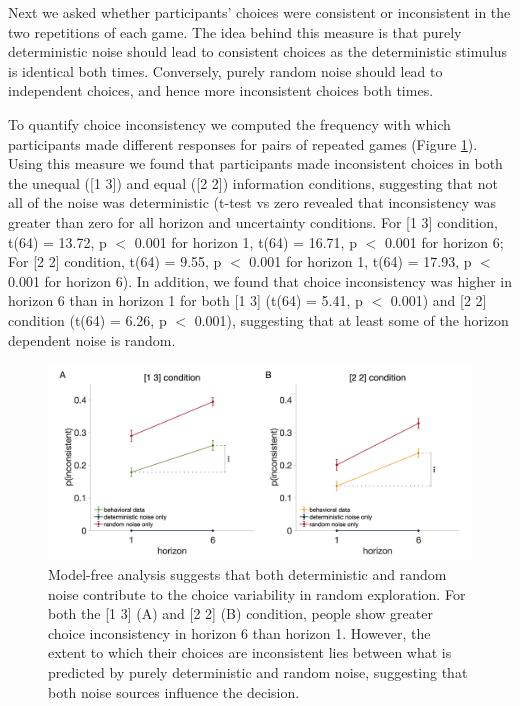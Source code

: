\documentclass[12pt]{article}
\begin{document}
	Next we asked whether participants' choices were consistent or inconsistent in the two repetitions of each game.  The idea behind this measure is that purely deterministic noise should lead to consistent choices as the deterministic stimulus is identical both times. Conversely, purely random noise should lead to independent choices, and hence more inconsistent choices both times. 
	
	To quantify choice inconsistency we computed the frequency with which participants made different responses for pairs of repeated games (Figure \ref{fig:mf2}). Using this measure we found that participants made inconsistent choices in both the unequal ([1 3]) and equal ([2 2]) information conditions, suggesting that not all of the noise was deterministic (t-test vs zero revealed that inconsistency was greater than zero for all horizon and uncertainty conditions.  For [1 3] condition, t(64) = 13.72, p $<$ 0.001 for horizon 1, t(64) = 16.71, p $<$ 0.001 for horizon 6; For [2 2] condition, t(64) = 9.55, p $<$ 0.001 for horizon 1, t(64) = 17.93, p $<$ 0.001 for horizon 6). In addition, we found that choice inconsistency was higher in horizon 6 than in horizon 1 for both [1 3] (t(64) = 5.41, p $<$ 0.001) and [2 2] condition (t(64) = 6.26, p $<$ 0.001), suggesting that at least some of the horizon dependent noise is random.
	
	\begin{figure}[h]
		\begin{center}
			\includegraphics[width=\textwidth]{figures/RanDetNoise_2noise.png}
			\caption{Model-free analysis suggests that both deterministic and random noise contribute to the choice variability in random exploration. For both the [1 3] (A) and [2 2] (B) condition, people show greater choice inconsistency in horizon 6 than horizon 1. However, the extent to which their choices are inconsistent lies between what is predicted by purely deterministic and random noise, suggesting that both noise sources influence the decision.}
			\label{fig:mf2}
		\end{center}
	\end{figure}
	
\end{document}
